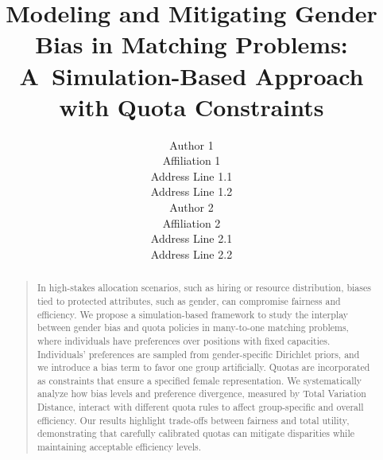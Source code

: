 \documentclass[letterpaper]{article}
\begin{document}
\title{Modeling and Mitigating Gender Bias in Matching Problems: A~Simulation-Based Approach with Quota Constraints}
\author{Author 1\\
Affiliation 1\\
Address Line 1.1\\
Address Line 1.2\\
\And Author 2\\
Affiliation 2\\
Address Line 2.1\\
Address Line 2.2\\
}


\maketitle
\begin{abstract}
\begin{quote}
In high-stakes allocation scenarios, such as hiring or resource distribution, biases tied to protected attributes, such as gender, can compromise fairness and efficiency. We propose a simulation-based framework to study the interplay between gender bias and quota policies in many-to-one matching problems, where individuals have preferences over positions with fixed capacities. Individuals' preferences are sampled from gender-specific Dirichlet priors, and we introduce a bias term to favor one group artificially. Quotas are incorporated as constraints that ensure a specified female representation. We systematically analyze how bias levels and preference divergence, measured by Total Variation Distance, interact with different quota rules to affect group-specific and overall efficiency. Our results highlight trade-offs between fairness and total utility, demonstrating that carefully calibrated quotas can mitigate disparities while maintaining acceptable efficiency levels. 
\end{quote}
\end{abstract}
\end{document}
